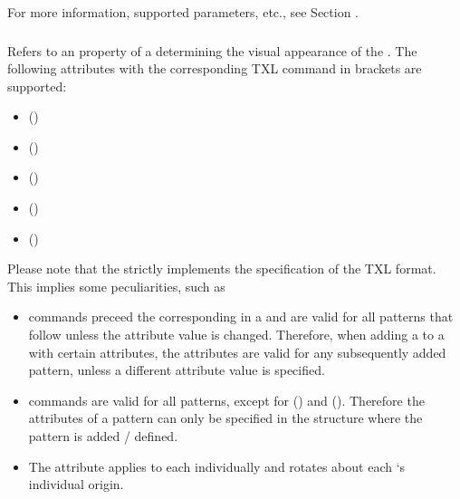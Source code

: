 \documentclass[letterpaper,10pt,english]{sphinxmanual}
\begin{document}
For more information, supported parameters, etc., see Section {\hyperref[Chapters/40_PythonModuleReference:pythonmodulereferencepatterns]{}}.


\subsubsection{}
\label{Chapters/10_Introduction:attribute}
Refers to an property of a  determining the visual appearance of the .
The following attributes with the corresponding TXL command in brackets are supported:
\begin{itemize}
\item {} 
 ()

\item {} 
 ()

\item {} 
 ()

\item {} 
 ()

\item {} 
 ()

\end{itemize}

Please note that the  strictly implements the specification of the TXL format.
This implies some peculiarities, such as
\begin{itemize}
\item {} 
 commands preceed the corresponding  in a  and are valid for all patterns that follow
unless the attribute value is changed. Therefore, when adding a  to a  with certain attributes,
the attributes are valid for any subsequently added pattern, unless a different attribute value is specified.

\item {} 
 commands are valid for all patterns, except for  () and  ().
Therefore the attributes of a pattern can only be specified in the structure where the pattern is added / defined.

\item {} 
The  attribute applies to each  individually and rotates about each `s individual origin.

\end{itemize}
\end{document}
